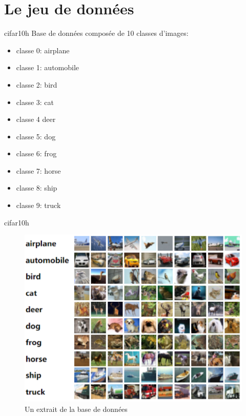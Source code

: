\documentclass[11pt]{beamer}
\begin{document}
	\section{Le jeu de données}
	\begin{frame}{cifar10h}
		Base de données composée de 10 classes d'images:
		\begin{itemize}
			\item classe 0: airplane \\
			\item classe 1: automobile \\
			\item classe 2: bird \\
			\item classe 3: cat \\
			\item classe 4 deer \\
			\item classe 5: dog \\
			\item classe 6: frog \\
			\item classe 7: horse \\
			\item classe 8: ship \\
			\item classe 9: truck
		\end{itemize}
	\end{frame}
	
	\begin{frame}{cifar10h}
		\begin{figure}[H]
			\centering
			\includegraphics[scale=0.45]{images/imagecifar10.png}
			\caption{Un extrait de la base de données}
		\end{figure}
	\end{frame}
	
\end{document}
